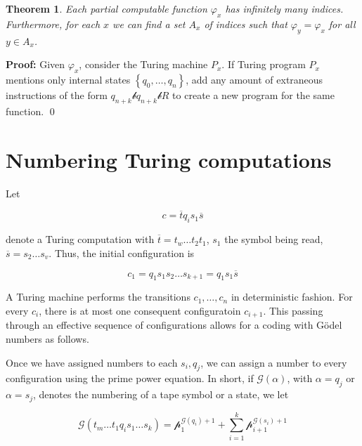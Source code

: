 \documentclass[a4paper, 12pt]{article}
\newtheorem{theorem}{Theorem}
\newtheorem{theorem}{Theorem}
\newenvironment{proof}[1][Proof]{\par\small\noindent\textbf{#1:} }{\qed\par\normalsize}
\begin{document}
\begin{theorem}
    Each partial computable function $\varphi_x$ has infinitely 
    many indices. Furthermore, for each $x$
    we can find a set $A_x$ of indices such that 
    $\varphi_y = \varphi_x$ for all $y \in A_x$.
\end{theorem}

\begin{proof}
    Given $\varphi_x$, consider the Turing machine $P_x$. If Turing program
    $P_x$ mentions only internal states $\left\{ q_0, \ldots, q_n \right\} $,
    add any amount of extraneous instructions of the form $q_{n+k}\mathcal{b}
    q_{n+k}\mathcal{b} R$ to create a new program for the same function.
\end{proof}

\section{Numbering Turing computations}

Let 

\begin{equation*}
    c = \overline{t} q_i s_1 \overline{s}
\end{equation*}

denote a Turing computation with $\overline{t} = t_{w}\ldots t_2t_1$,
$s_1$ the symbol being read, $\overline{s} = s_2\ldots s_v$.
Thus, the initial configuration is 

\begin{equation*}
    c_1 = q_1 s_1 s_2 \ldots s_{k+1} = q_1 s_1 \overline{s}
\end{equation*}

A Turing machine performs the transitions $c_1, \ldots, c_n$ in 
deterministic fashion. For every $c_i$, there is at most one 
consequent configuratoin $c_{i+1}$. This passing through an 
effective sequence of configurations allows for a coding 
with Gödel numbers as follows.

Once we have assigned numbers to each $s_i, q_j$, we can assign 
a number to every configuration using the prime power equation. 
In short, if $\mathcal{G}(\alpha)$, with $\alpha = q_j$ or $\alpha = s_j$,
denotes the numbering of a tape symbol or a state, we let 

\begin{equation*}
    \mathcal{G}(t_m\ldots t_1 q_i s_1 \ldots s_k) = \mathcal{p}_1^{\mathcal{G}(q_i) + 1} + \sum_{i=1}^{k} \mathcal{p}_{i+1}^{\mathcal{G}(s_i) + 1}
\end{equation*}
\end{document}

